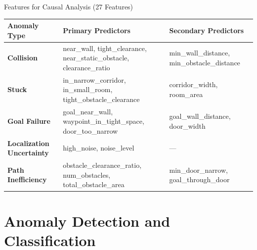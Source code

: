 \documentclass[aspectratio=169, 11pt]{beamer}
\newcommand{\fullsectiontitle}{}
\newcommand{\presentationsection}[2][]{%
  \gdef\fullsectiontitle{#2}%
  \section[#1]{#2}%
}
\begin{document}
\begin{frame}{Features for Causal Analysis (27 Features)}
  \begin{table}
    \tiny
    \renewcommand{\arraystretch}{1.3}
    \begin{tabular}{@{}L{2.0cm} L{6.0cm} L{4.5cm}@{}}
      \toprule
      \textbf{Anomaly Type} & \textbf{Primary Predictors} & \textbf{Secondary Predictors} \\
      \midrule
      \textbf{Collision} & near\_wall, tight\_clearance, near\_static\_obstacle, clearance\_ratio & min\_wall\_distance, min\_obstacle\_distance \\
      \textbf{Stuck} & in\_narrow\_corridor, in\_small\_room, tight\_obstacle\_clearance & corridor\_width, room\_area \\
      \textbf{Goal Failure} & goal\_near\_wall, waypoint\_in\_tight\_space, door\_too\_narrow & goal\_wall\_distance, door\_width \\
      \textbf{Localization Uncertainty} & high\_noise, noise\_level & --- \\
      \textbf{Path Inefficiency} & obstacle\_clearance\_ratio, num\_obstacles, total\_obstacle\_area & min\_door\_narrow, goal\_through\_door \\
      \bottomrule
    \end{tabular}
  \end{table}
\end{frame}

\presentationsection[Anomaly Detection and Classification]{Anomaly Detection and Classification}
\end{document}
